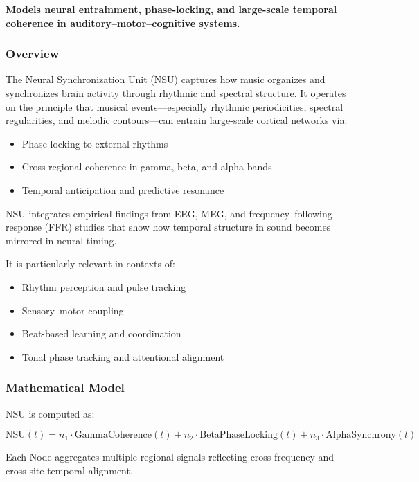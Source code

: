 \textbf{Models neural entrainment, phase-locking, and large-scale temporal coherence in auditory–motor–cognitive systems.}

\subsubsection*{Overview}

The Neural Synchronization Unit (NSU) captures how music organizes and synchronizes brain activity through rhythmic and spectral structure. It operates on the principle that musical events—especially rhythmic periodicities, spectral regularities, and melodic contours—can entrain large-scale cortical networks via:

\begin{itemize}
    \item Phase-locking to external rhythms
    \item Cross-regional coherence in gamma, beta, and alpha bands
    \item Temporal anticipation and predictive resonance
\end{itemize}

NSU integrates empirical findings from EEG, MEG, and frequency–following response (FFR) studies that show how temporal structure in sound becomes mirrored in neural timing.

It is particularly relevant in contexts of:

\begin{itemize}
    \item Rhythm perception and pulse tracking
    \item Sensory–motor coupling
    \item Beat-based learning and coordination
    \item Tonal phase tracking and attentional alignment
\end{itemize}

\subsubsection*{Mathematical Model}

NSU is computed as:

\[
\text{NSU}(t) = n_1 \cdot \text{GammaCoherence}(t) + n_2 \cdot \text{BetaPhaseLocking}(t) + n_3 \cdot \text{AlphaSynchrony}(t)
\]

Each Node aggregates multiple regional signals reflecting cross-frequency and cross-site temporal alignment.

